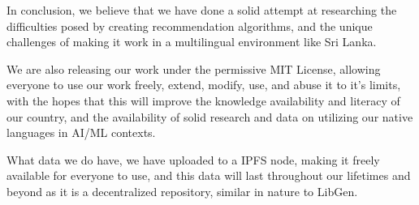 In conclusion, we believe that we have done a solid attempt at researching the difficulties posed by creating recommendation algorithms, and the unique challenges of making it work in a multilingual environment like Sri Lanka.

We are also releasing our work under the permissive MIT License, allowing everyone to use our work freely, extend, modify, use, and abuse it to it's limits, with the hopes that this will improve the knowledge availability and literacy of our country, and the availability of solid research and data on utilizing our native languages in AI/ML contexts.

What data we do have, we have uploaded to a IPFS node, making it freely available for everyone to use, and this data will last throughout our lifetimes and beyond as it is a decentralized repository, similar in nature to LibGen.